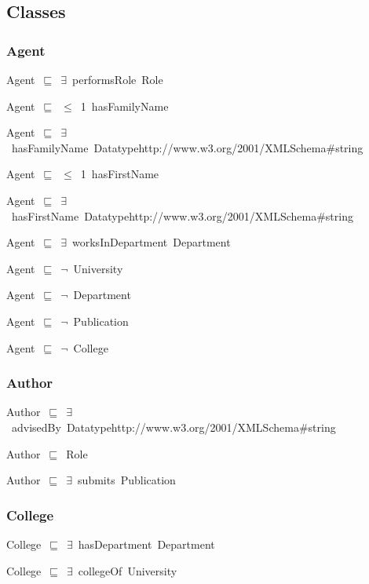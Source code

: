 \documentclass{article}
\begin{document}
\subsection*{Classes}

\subsubsection*{Agent}

Agent~\ensuremath{\sqsubseteq}~\ensuremath{\exists}~performsRole~Role~

Agent~\ensuremath{\sqsubseteq}~\ensuremath{\leq}~1~hasFamilyName~

Agent~\ensuremath{\sqsubseteq}~\ensuremath{\exists}~hasFamilyName~Datatypehttp://www.w3.org/2001/XMLSchema#string~

Agent~\ensuremath{\sqsubseteq}~\ensuremath{\leq}~1~hasFirstName~

Agent~\ensuremath{\sqsubseteq}~\ensuremath{\exists}~hasFirstName~Datatypehttp://www.w3.org/2001/XMLSchema#string~

Agent~\ensuremath{\sqsubseteq}~\ensuremath{\exists}~worksInDepartment~Department~

Agent~\ensuremath{\sqsubseteq}~\ensuremath{\lnot}~University

Agent~\ensuremath{\sqsubseteq}~\ensuremath{\lnot}~Department

Agent~\ensuremath{\sqsubseteq}~\ensuremath{\lnot}~Publication

Agent~\ensuremath{\sqsubseteq}~\ensuremath{\lnot}~College

\subsubsection*{Author}

Author~\ensuremath{\sqsubseteq}~\ensuremath{\exists}~advisedBy~Datatypehttp://www.w3.org/2001/XMLSchema#string~

Author~\ensuremath{\sqsubseteq}~Role~

Author~\ensuremath{\sqsubseteq}~\ensuremath{\exists}~submits~Publication~

\subsubsection*{College}

College~\ensuremath{\sqsubseteq}~\ensuremath{\exists}~hasDepartment~Department~

College~\ensuremath{\sqsubseteq}~\ensuremath{\exists}~collegeOf~University~
\end{document}

